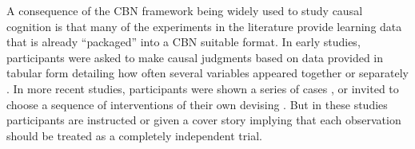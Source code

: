 \documentclass{cambridge7A}%
\begin{document}

A consequence of the CBN framework being widely used to study causal cognition is that many of the experiments in the literature provide learning data that is already ``packaged'' into a CBN suitable format.  %
In early studies, participants were asked to make causal judgments based on data provided in tabular form detailing how often several variables appeared together or separately \citep{cheng1990probabilistic}.   In more recent studies, participants were shown a series of cases \citep{gopnik2000detecting,sobel2004children,deverett2012learning,lagnado2002learning},  or invited to choose a sequence of interventions of their own devising \citep{coenen2015strategies,bramley2015fcs,bramley2017neurath}.  But in these studies participants are instructed or given a cover story implying that each observation should be treated as a completely independent trial.   
\end{document}
